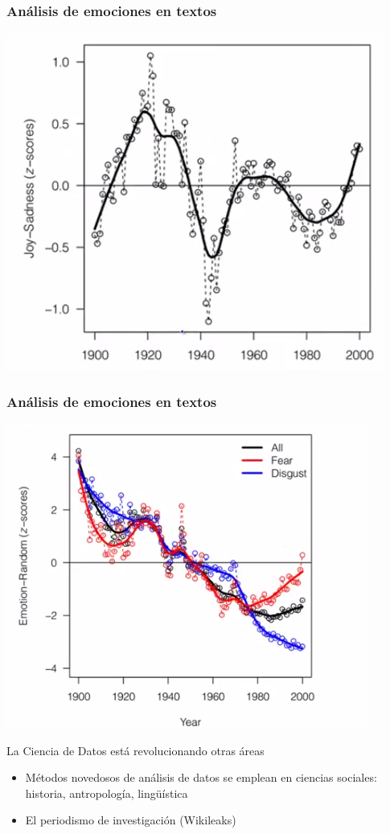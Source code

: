 \documentclass{beamer}
\begin{document}
\begin{frame}
\frametitle{An\'alisis de emociones en textos}
\includegraphics[scale=.5]{img/afect1.png}
\end{frame}

\begin{frame}
\frametitle{An\'alisis de emociones en textos}
\includegraphics[scale=.5]{img/afect2.png}
\end{frame}


\begin {frame}

La Ciencia de Datos est\'a revolucionando otras \'areas
	\begin{itemize}
	\item M\'etodos novedosos de an\'alisis de datos se emplean en 
	ciencias sociales: historia, antropolog\'ia, lingü\'istica
	\item El periodismo de investigaci\'on (Wikileaks)
	\end{itemize}

\end{frame}
\end{document}
